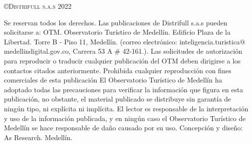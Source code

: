 \thispagestyle{empty}
\vspace*{0.5cm}
\begin{flushleft}
	{\Large\scshape \copyright Distrifull s.a.s 2022\\[5pt] }
\end{flushleft}

\vspace*{1cm}
\begin{flushleft}
\end{flushleft}

\vspace*{1cm}
\begin{flushleft}
	{\Large\scshape }
\end{flushleft}

\vspace*{2cm}
\begin{flushleft}
	{\large\scshape     }
\end{flushleft}

\vspace*{2cm}
\begin{flushleft}
	{Se reservan todos los derechos. Las publicaciones de Distrifull s.a.s }
	{pueden solicitarse a:}
	{OTM. Observatorio Tur\'istico de Medell\'in. Edificio Plaza de la}
	{Libertad. Torre B - Piso 11, }
	{Medell\'in. (correo electr\'onico:} 
	{inteligencia.turistica@ medellindigital.gov.co, Carrera 53 A $\#$ 42-161.).} 
	{Las solicitudes de autorizaci\'on para reproducir o traducir cualquier publicaci\'on}
	{del OTM deben dirigirse a los contactos citados anteriormente. Prohibida} 
	{cualquier reproducci\'on con fines comerciales de esta publicaci\'on}
	{El Observatorio Tur\'istico de Medell\'in ha adoptado todas las} 
	{precauciones para verificar }
	{la informaci\'on que figura en esta publicaci\'on, no obstante, el}
	{material publicado se distribuye sin garant\'ia de ning\'un tipo, ni} {expl\'icita ni impl\'icita. El lector es responsable de la }
	{interpretaci\'on y uso de la informaci\'on publicada, y en ning\'un caso {el Observatorio Tur\'istico de Medell\'in se hace responsable de} da\~no} 
	{causado por su uso.}
	{Concepci\'on y dise\~no: As Research. Medell\'in.}
\end{flushleft}







